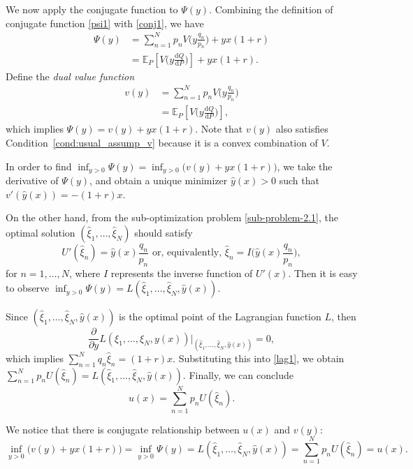 \documentclass[a4paper]{article}
\theoremstyle{definition}
\numberwithin{equation}{section}
\begin{document}
We now apply the conjugate function to $\Psi(y)$. Combining the definition of conjugate function \eqref{psi1} with \eqref{conj1}, we have
\begin{equation}\nonumber
\begin{aligned}
\Psi(y)
&=\sum^N_{n=1}p_nV\big(y\frac{q_n}{p_n}\big)+yx(1+r)\\
&=\mathbb E_P[V\Big(y\frac{\mathrm dQ}{\mathrm dP}\Big)]+yx(1+r).
\end{aligned}
\end{equation}
Define the \emph{dual value function}
\begin{equation}\nonumber
\begin{aligned}
v(y)
&=\sum^N_{n=1}p_nV\big(y\frac{q_n}{p_n}\big)\\
&=\mathbb E_P[V\Big(y\frac{\mathrm dQ}{\mathrm dP}\Big)],
\end{aligned}
\end{equation}
which implies $\Psi(y)=v(y)+yx(1+r)$.
Note that $v(y)$ also satisfies Condition~\ref{cond:usual_assump_v} because it is a convex combination of $V$.

In order to find $\inf_{y>0}\Psi(y)=\inf_{y>0}\big(v(y)+yx(1+r)\big)$, we take the derivative of $\Psi(y)$, and obtain a unique minimizer $\hat y(x)>0$ such that $v'(\hat y(x))=-(1+r)x$.

On the other hand, from the sub-optimization problem \eqref{sub-problem-2.1}, the optimal solution $(\hat\xi_1,\dots,\hat\xi_N)$ should satisfy
\begin{equation}\nonumber
U'(\hat\xi_n)=\hat y(x)\frac{q_n}{p_n}\text{ or, equivalently, }
\hat\xi_n=I\big(\hat y(x)\frac{q_n}{p_n}\big),
\end{equation}
for $n=1,\dots,N$, where $I$ represents the inverse  function of $U'(x)$. Then it is easy to observe
$\inf_{y>0}\Psi(y)=L(\hat\xi_1,\dots,\hat\xi_N,\hat y(x))$.

Since $(\hat\xi_1,\dots,\hat\xi_N,\hat y(x))$ is the optimal point of the Lagrangian function $L$, then
$$\frac{\partial}{\partial y}L(\xi_1,\dots,\xi_N,y(x))\lvert_{(\hat\xi_1,\dots,\hat\xi_N,\hat y(x))}=0,$$
which implies
$\sum^N_{n=1}q_n\hat\xi_n=(1+r)x$.
Substituting this into \eqref{lag1}, we obtain
$\sum^N_{n=1}p_nU(\hat\xi_n)=L(\hat\xi_1,\dots,\hat\xi_N,\hat y(x))$.
Finally, we can conclude
\begin{equation}\nonumber
u(x)=\sum^N_{n=1}p_nU(\hat\xi_n).
\end{equation}

We notice that there is conjugate relationship between $u(x)$ and $v(y)$:
$$\inf_{y>0}\big(v(y)+yx(1+r)\big)=\inf_{y>0}\Psi(y)=L(\hat\xi_1,\dots,\hat\xi_N,\hat y(x))=\sum^N_{n=1}p_nU(\hat\xi_n)=u(x).$$
\end{document}
